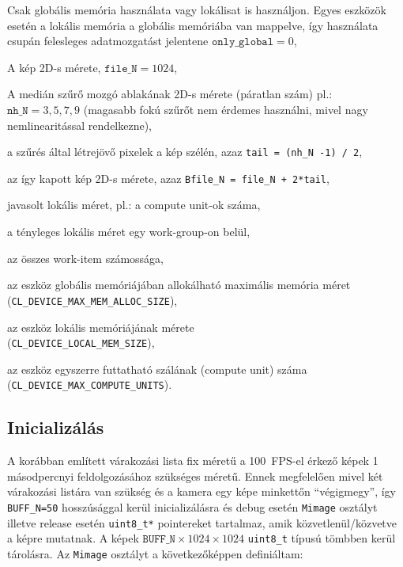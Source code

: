 	\begin{description}[noitemsep]
	\item[only\_global] Csak globális memória használata vagy lokálisat is használjon. Egyes eszközök esetén a lokális memória a
	globális memóriába van mappelve, így használata csupán felesleges adatmozgatást jelentene $\texttt{only\_global} = 0$,
	\item[file\_N] A kép 2D-s mérete, $\texttt{file\_N} = 1024$,
	\item[nh\_N] A medián szűrő mozgó ablakának 2D-s mérete (páratlan szám) pl.: $\texttt{nh\_N} = 3,5,7,9$ (magasabb fokú szűrőt
	nem érdemes használni, mivel nagy nemlinearitással rendelkezne),
	\item[tail] a szűrés által létrejövő pixelek a kép szélén, azaz \texttt{tail = (nh\_N -1) / 2},
	\item[Bfile\_N] az így kapott kép 2D-s mérete, azaz \texttt{Bfile\_N = file\_N + 2*tail},
	\item[pplN] javasolt lokális méret, pl.: a compute unit-ok száma,
	\item[localN] a tényleges lokális méret egy work-group-on belül,
	\item[globalN] az összes work-item számossága,
	\item[aSize] az eszköz globális memóriájában allokálható maximális memória méret\\
		(\texttt{CL\_DEVICE\_MAX\_MEM\_ALLOC\_SIZE}),
	\item[lSize] az eszköz lokális memóriájának mérete\\
		(\texttt{CL\_DEVICE\_LOCAL\_MEM\_SIZE}),
	\item[mCuint] az eszköz egyszerre futtatható szálának (compute unit) száma \\
		(\texttt{CL\_DEVICE\_MAX\_COMPUTE\_UNITS}).
	\end{description}
	

	\subsection*{Inicializálás}
	A korábban említett várakozási lista fix méretű a 100~FPS-el érkező képek 1 másodpercnyi feldolgozásához szükséges
	méretű. Ennek megfelelően mivel két várakozási listára van szükség és a kamera egy képe minkettőn ``végigmegy'', így
	\texttt{BUFF\_N=50} hosszúsággal kerül inicializálásra és debug esetén \texttt{Mimage} osztályt illetve release esetén
	\texttt{uint8\_t*} pointereket tartalmaz, amik közvetlenül/közvetve a képre mutatnak.
	A képek $\texttt{BUFF\_N} \times 1024 \times 1024$ \texttt{uint8\_t} típusú tömbben kerül tárolásra.
	Az \texttt{Mimage} osztályt a következőképpen definiáltam:
	
